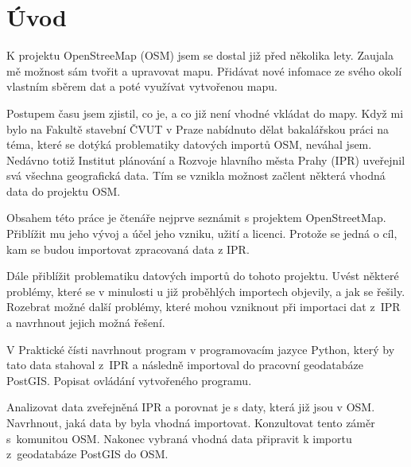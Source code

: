 \chapter{Úvod}
\label{1-uvod}


K projektu OpenStreeMap (OSM) jsem se dostal již před několika lety.
Zaujala mě možnost sám tvořit a upravovat mapu.
Přidávat nové infomace ze svého okolí vlastním sběrem dat
a poté využívat vytvořenou mapu.

Postupem času jsem zjistil, co je, a co již není vhodné vkládat do mapy.
Když mi bylo na Fakultě stavební ČVUT v Praze nabídnuto dělat
bakalářskou práci na téma, které se dotýká problematiky datových importů OSM,
neváhal jsem. Nedávno totiž Institut plánování a Rozvoje hlavního města Prahy
(IPR) uveřejnil svá všechna geografická data.
Tím se vznikla možnost začlent některá vhodná data do projektu OSM.

Obsahem této práce je čtenáře nejprve seznámit s projektem OpenStreetMap.
Přiblížit mu jeho vývoj a účel jeho vzniku, užití a licenci.
Protože se jedná o cíl, kam se budou importovat zpracovaná data z IPR.

Dále přiblížit problematiku datových importů do tohoto projektu. Uvést některé
problémy, které se v minulosti u již proběhlých importech objevily, a jak se
řešily. Rozebrat možné další problémy, které mohou vzniknout při importaci dat
z~IPR a navrhnout jejich možná řešení.

V Praktické čísti navrhnout program v programovacím jazyce Python,
který by tato data stahoval z~IPR a následně importoval do pracovní geodatabáze
PostGIS. Popisat ovládání vytvořeného programu.

Analizovat data zveřejněná IPR a porovnat je s daty, která již jsou v OSM.
Navrhnout, jaká data by byla vhodná importovat.
Konzultovat tento záměr s~komunitou OSM.
Nakonec vybraná vhodná data připravit k importu z~geodatabáze PostGIS do OSM.
